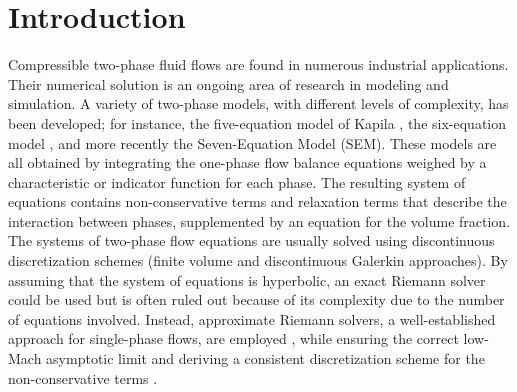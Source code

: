 \documentclass[preprint,10pt]{elsarticle}
\begin{document}
\section{Introduction}\label{sec:intro}
%
Compressible two-phase fluid flows are found in numerous industrial applications. Their numerical solution is an ongoing area of research 
in modeling and simulation. A variety of two-phase models, with different levels of complexity, has been developed; for instance, 
the five-equation model of Kapila \cite{Kapila_2001}, the six-equation model \cite{Toumi_1996}, and more recently the Seven-Equation 
Model  (SEM)\cite{SEM}. These models are all obtained by integrating the one-phase flow balance equations weighed by a characteristic 
or indicator function for each phase. The resulting system of equations contains non-conservative terms and relaxation terms that 
describe the interaction between phases, supplemented by an equation for the volume fraction. 
The systems of two-phase flow equations are usually solved using discontinuous discretization schemes (finite volume and discontinuous 
Galerkin approaches). By assuming that the system of equations is hyperbolic, an exact Riemann solver could be used but is often ruled 
out because of its complexity due to the number of equations involved. Instead, approximate Riemann solvers, a well-established approach 
for single-phase flows, are employed \cite{Saurel_2001a, Saurel_2001b, Li_2004, Zein_2010, Ambroso_2012},  while ensuring the correct 
low-Mach asymptotic limit and deriving a consistent discretization scheme for the non-conservative terms \cite{Li_2004, Abgrall_2002}.
%
\end{document}
